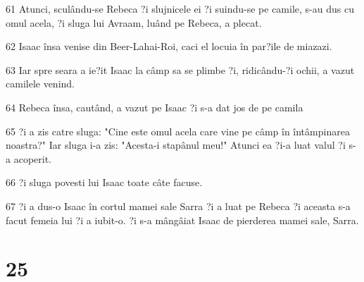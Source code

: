 \par 61 Atunci, sculându-se Rebeca ?i slujnicele ei ?i suindu-se pe camile, s-au dus cu omul acela, ?i sluga lui Avraam, luând pe Rebeca, a plecat.
\par 62 Isaac însa venise din Beer-Lahai-Roi, caci el locuia în par?ile de miazazi.
\par 63 Iar spre seara a ie?it Isaac la câmp sa se plimbe ?i, ridicându-?i ochii, a vazut camilele venind.
\par 64 Rebeca însa, cautând, a vazut pe Isaac ?i s-a dat jos de pe camila
\par 65 ?i a zis catre sluga: "Cine este omul acela care vine pe câmp în întâmpinarea noastra?" Iar sluga i-a zis: "Acesta-i stapânul meu!" Atunci ea ?i-a luat valul ?i s-a acoperit.
\par 66 ?i sluga povesti lui Isaac toate câte facuse.
\par 67 ?i a dus-o Isaac în cortul mamei sale Sarra ?i a luat pe Rebeca ?i aceasta s-a facut femeia lui ?i a iubit-o. ?i s-a mângâiat Isaac de pierderea mamei sale, Sarra.

\chapter{25}

